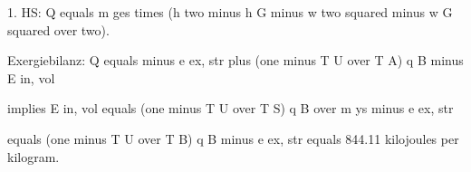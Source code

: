 1. HS: Q equals m ges times (h two minus h G minus w two squared minus w G squared over two).

Exergiebilanz: Q equals minus e ex, str plus (one minus T U over T A) q B minus E in, vol

implies E in, vol equals (one minus T U over T S) q B over m ys minus e ex, str

equals (one minus T U over T B) q B minus e ex, str equals 844.11 kilojoules per kilogram.